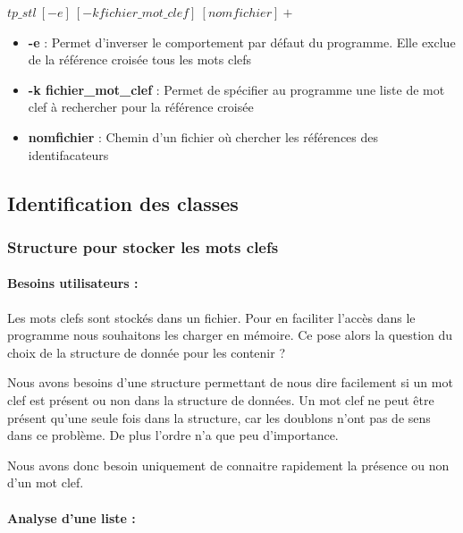 \documentclass{article}
\begin{document}
\begin{center}
\textbf{$tp\_stl\ [-e]\ [-k fichier\_mot\_clef]\ [nomfichier]+$}
\end{center}

\begin{itemize}

 \item[] \textbf{-e} : Permet d'inverser le comportement par défaut du programme. Elle exclue de la référence croisée tous les mots clefs
 
 \item[] \textbf{-k fichier\_mot\_clef} : Permet de spécifier au programme une liste de mot clef à rechercher pour la référence croisée

 \item[] \textbf{nomfichier} : Chemin d'un fichier où chercher les références des identifacateurs

\end{itemize}

\subsection{Identification des classes}

\subsubsection{Structure pour stocker les mots clefs}

\paragraph{Besoins utilisateurs :}
Les mots clefs sont stockés dans un fichier. Pour en faciliter l'accès dans le programme nous souhaitons les charger en mémoire. Ce pose alors la question du choix de la structure de donnée pour les contenir ?

Nous avons besoins d'une structure permettant de nous dire facilement si un mot clef est présent ou non dans la structure de données. Un mot clef ne peut être présent qu'une seule fois dans la structure, car les doublons n'ont pas de sens dans ce problème. De plus l'ordre n'a que peu d'importance.

Nous avons donc besoin uniquement de connaitre rapidement la présence ou non d'un mot clef.

\paragraph{Analyse d'une liste :} 
\end{document}

